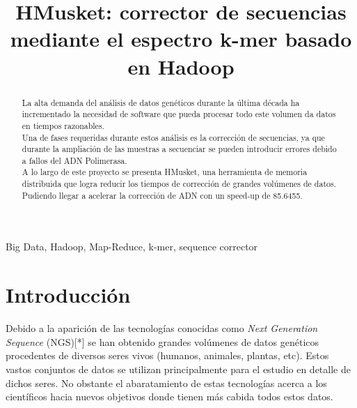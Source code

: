 \documentclass[conference]{IEEEtran}
\begin{document}
\title{HMusket: corrector de secuencias mediante el espectro k-mer basado en Hadoop}

\author{
\and
{}
\and
{}
}

\maketitle

\begin{abstract}
La alta demanda del análisis de datos genéticos durante la última década ha incrementado la necesidad de software que pueda procesar todo este volumen da datos en tiempos razonables.\\
Una de fases requeridas durante estos análisis es la corrección de secuencias, ya que durante la ampliación de las muestras a secuenciar se pueden introducir errores debido a fallos del ADN Polimerasa.\\
A lo largo de este proyecto se presenta HMusket, una herramienta de memoria distribuida que logra reducir los tiempos de corrección de grandes volúmenes de datos. Pudiendo llegar a acelerar la corrección de ADN con un speed-up de 85.6455.
\end{abstract}

\begin{IEEEkeywords}
Big Data, Hadoop, Map-Reduce, k-mer, sequence corrector
\end{IEEEkeywords}

\section{Introducción}
Debido a la aparición de las tecnologías conocidas como \textit{Next Generation Sequence} (NGS)[*] se han obtenido grandes volúmenes de datos genéticos procedentes de diversos seres vivos (humanos, animales, plantas, etc). Estos vastos conjuntos de datos se utilizan principalmente para el estudio en detalle de dichos seres. 
No obstante el abaratamiento de estas tecnologías acerca a los científicos hacia nuevos objetivos donde tienen más cabida todos estos datos.
\\
\end{document}
